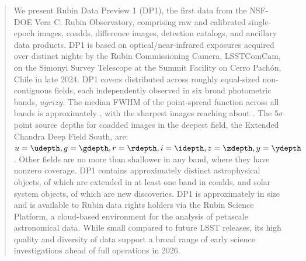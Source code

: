 \begin{abstract}
We present Rubin Data Preview 1 (DP1), the first data from the NSF-DOE Vera C. Rubin Observatory, comprising raw and calibrated single-epoch images, coadds, difference images, detection catalogs, and ancillary data products.
DP1 is based on \nexposures optical/near-infrared exposures acquired over \nnightscomcam distinct nights by the Rubin Commissioning Camera, LSSTComCam, on the Simonyi Survey Telescope at the Summit Facility on Cerro Pach\'on, Chile in late 2024.
DP1 covers \totalarea distributed across \nfields roughly equal-sized non-contiguous fields, each independently observed in six broad photometric bands, $ugrizy$.
The median FWHM of the point-spread function across all bands is approximately \medianimagequalityallbands, with the sharpest images reaching about \bestimagequality.
The 5$\sigma$  point source  depths for coadded  images in the deepest field, the Extended Chandra Deep Field South, are: $u = \udepth,  g = \gdepth, r = \rdepth, i = \idepth, z = \zdepth, y = \ydepth$.
Other fields are no more than \maxdepthshalloweranyband shallower in any band, where they have nonzero coverage.
DP1 contains approximately \nobjects distinct astrophysical objects, of which \nextendedobjects are extended in at least one band in coadds, and \nsolarsystemobjects solar system objects, of which \nnewasteroiddiscoveries are new discoveries.
DP1 is approximately \sizeinbytes in size and is available to Rubin data rights holders via the Rubin Science Platform, a cloud-based environment for the analysis of petascale astronomical data.
While small compared to future LSST releases, its high quality and diversity of data support a broad range of early science investigations ahead of full operations in 2026.
\end{abstract}